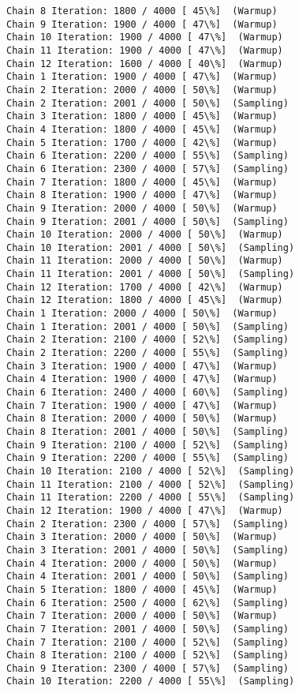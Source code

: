 \documentclass[11pt]{article}
\begin{document}
\begin{Verbatim}[commandchars=\\\{\}]
Chain 8 Iteration: 1800 / 4000 [ 45\%]  (Warmup)
Chain 9 Iteration: 1900 / 4000 [ 47\%]  (Warmup)
Chain 10 Iteration: 1900 / 4000 [ 47\%]  (Warmup)
Chain 11 Iteration: 1900 / 4000 [ 47\%]  (Warmup)
Chain 12 Iteration: 1600 / 4000 [ 40\%]  (Warmup)
Chain 1 Iteration: 1900 / 4000 [ 47\%]  (Warmup)
Chain 2 Iteration: 2000 / 4000 [ 50\%]  (Warmup)
Chain 2 Iteration: 2001 / 4000 [ 50\%]  (Sampling)
Chain 3 Iteration: 1800 / 4000 [ 45\%]  (Warmup)
Chain 4 Iteration: 1800 / 4000 [ 45\%]  (Warmup)
Chain 5 Iteration: 1700 / 4000 [ 42\%]  (Warmup)
Chain 6 Iteration: 2200 / 4000 [ 55\%]  (Sampling)
Chain 6 Iteration: 2300 / 4000 [ 57\%]  (Sampling)
Chain 7 Iteration: 1800 / 4000 [ 45\%]  (Warmup)
Chain 8 Iteration: 1900 / 4000 [ 47\%]  (Warmup)
Chain 9 Iteration: 2000 / 4000 [ 50\%]  (Warmup)
Chain 9 Iteration: 2001 / 4000 [ 50\%]  (Sampling)
Chain 10 Iteration: 2000 / 4000 [ 50\%]  (Warmup)
Chain 10 Iteration: 2001 / 4000 [ 50\%]  (Sampling)
Chain 11 Iteration: 2000 / 4000 [ 50\%]  (Warmup)
Chain 11 Iteration: 2001 / 4000 [ 50\%]  (Sampling)
Chain 12 Iteration: 1700 / 4000 [ 42\%]  (Warmup)
Chain 12 Iteration: 1800 / 4000 [ 45\%]  (Warmup)
Chain 1 Iteration: 2000 / 4000 [ 50\%]  (Warmup)
Chain 1 Iteration: 2001 / 4000 [ 50\%]  (Sampling)
Chain 2 Iteration: 2100 / 4000 [ 52\%]  (Sampling)
Chain 2 Iteration: 2200 / 4000 [ 55\%]  (Sampling)
Chain 3 Iteration: 1900 / 4000 [ 47\%]  (Warmup)
Chain 4 Iteration: 1900 / 4000 [ 47\%]  (Warmup)
Chain 6 Iteration: 2400 / 4000 [ 60\%]  (Sampling)
Chain 7 Iteration: 1900 / 4000 [ 47\%]  (Warmup)
Chain 8 Iteration: 2000 / 4000 [ 50\%]  (Warmup)
Chain 8 Iteration: 2001 / 4000 [ 50\%]  (Sampling)
Chain 9 Iteration: 2100 / 4000 [ 52\%]  (Sampling)
Chain 9 Iteration: 2200 / 4000 [ 55\%]  (Sampling)
Chain 10 Iteration: 2100 / 4000 [ 52\%]  (Sampling)
Chain 11 Iteration: 2100 / 4000 [ 52\%]  (Sampling)
Chain 11 Iteration: 2200 / 4000 [ 55\%]  (Sampling)
Chain 12 Iteration: 1900 / 4000 [ 47\%]  (Warmup)
Chain 2 Iteration: 2300 / 4000 [ 57\%]  (Sampling)
Chain 3 Iteration: 2000 / 4000 [ 50\%]  (Warmup)
Chain 3 Iteration: 2001 / 4000 [ 50\%]  (Sampling)
Chain 4 Iteration: 2000 / 4000 [ 50\%]  (Warmup)
Chain 4 Iteration: 2001 / 4000 [ 50\%]  (Sampling)
Chain 5 Iteration: 1800 / 4000 [ 45\%]  (Warmup)
Chain 6 Iteration: 2500 / 4000 [ 62\%]  (Sampling)
Chain 7 Iteration: 2000 / 4000 [ 50\%]  (Warmup)
Chain 7 Iteration: 2001 / 4000 [ 50\%]  (Sampling)
Chain 7 Iteration: 2100 / 4000 [ 52\%]  (Sampling)
Chain 8 Iteration: 2100 / 4000 [ 52\%]  (Sampling)
Chain 9 Iteration: 2300 / 4000 [ 57\%]  (Sampling)
Chain 10 Iteration: 2200 / 4000 [ 55\%]  (Sampling)

\end{Verbatim}
\end{document}
